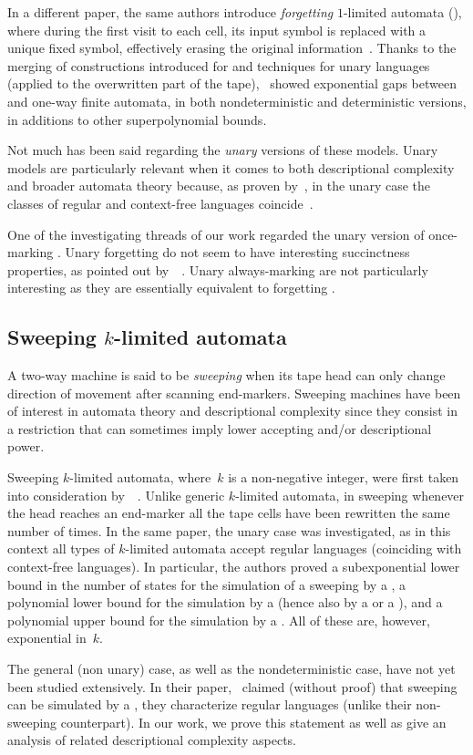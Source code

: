 In a different paper, the same authors introduce \emph{forgetting} $1$-limited automata (\FOLA), where during the first visit to each cell, its input symbol is replaced with a unique fixed symbol, effectively erasing the original information~\cite{PigPri23,JanMra+93}.
Thanks to the merging of constructions introduced for \AMOLA and techniques for unary languages (applied to the overwritten part of the tape),~\citeauthor{PigPri23} showed exponential gaps between \AMOLA and one-way finite automata, in both nondeterministic and deterministic versions, in additions to other superpolynomial bounds.

Not much has been said regarding the \emph{unary} versions of these models.
Unary models are particularly relevant when it comes to both descriptional complexity and broader automata theory because, as proven by~\citeauthor{GinRic62}, in the unary case the classes of regular and context-free languages coincide~\cite{GinRic62}.

One of the investigating threads of our work regarded the unary version of once-marking \OLAs.
Unary forgetting \OLAs do not seem to have interesting succinctness properties, as pointed out by~\citeauthor{PigPri23}~\cite{PigPri23}.
Unary always-marking \OLAs are not particularly interesting as they are essentially equivalent to forgetting \OLA.


\subsection{Sweeping \texorpdfstring{$k$}{k}-limited automata}
A two-way machine is said to be \emph{sweeping} when its tape head can only change direction of movement after scanning end-markers.
Sweeping machines have been of interest in automata theory and descriptional complexity since they consist in a restriction that can sometimes imply lower accepting and/or descriptional power.

Sweeping $k$-limited automata, where~$k$ is a non-negative integer, were first taken into consideration by~\citeauthor{KutPig+18}~\cite{KutPig+18}.
Unlike generic $k$-limited automata, in sweeping \kLA whenever the head reaches an end-marker all the tape cells have been rewritten the same number of times.
In the same paper, the unary case was investigated, as in this context all types of $k$-limited automata accept regular languages (coinciding with context-free languages).
In particular, the authors proved a subexponential lower bound in the number of states for the simulation of a sweeping \kDLA by a \ODFA, a polynomial lower bound for the simulation by a \TNFA (hence also by a \TDFA or a \ONFA), and a polynomial upper bound for the simulation by a \TDFA.
All of these are, however, exponential in~$k$.

The general (non unary) case, as well as the nondeterministic case, have not yet been studied extensively.
In their paper,~\citeauthor{KutPig+18} claimed (without proof) that sweeping \kLAs can be simulated by a \ONFA, \ie they characterize regular languages (unlike their non-sweeping counterpart).
In our work, we prove this statement as well as give an analysis of related descriptional complexity aspects.
